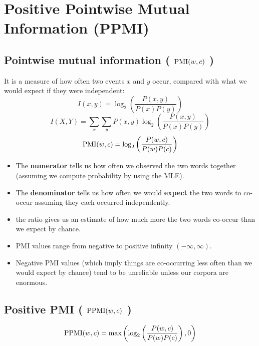 \chapter{Positive Pointwise Mutual Information (PPMI) \cite{nlp-1}}

\section{Pointwise mutual information ( $\operatorname{PMI}(w,c)$ ) \cite{nlp-1}}
It is a measure of how often two events $x$ and $y$ occur, compared with what we would expect if they were independent:
\[
    I(x,y) = \log_2\left(\displaystyle\frac{P(x,y)}{P(x)P(y)}\right)
\]
\[
    \displaystyle I(X,Y) = \sum_x \sum_y P(x,y) \log_2\left(\frac{P(x,y)}{P(x)P(y)}\right)
\]
\[
    \operatorname{PMI}(w,c) = \log_2\left(\displaystyle\frac{P(w,c)}{P(w)P(c)}\right)
\]

\begin{itemize}
    \item The \textbf{numerator} tells us how often we observed the two words together (assuming we compute probability by using the MLE).

    \item The \textbf{denominator} tells us how often we would \textbf{expect} the two words to co-occur assuming they each occurred independently.

    \item the ratio gives us an estimate of how much more the two words co-occur than we expect by chance.

    \item PMI values range from negative to positive infinity $(-\infty, \infty)$.

    \item Negative PMI values (which imply things are co-occurring less often than we would expect by chance) tend to be unreliable unless our corpora are enormous.

    
\end{itemize}


\section{Positive PMI ( $\operatorname{PPMI}(w,c)$ ) \cite{nlp-1}}\label{Positive Pointwise Mutual Information (PPMI)}

\[
    \operatorname{PPMI}(w,c) = \max\left(\log_2\left(\displaystyle\frac{P(w,c)}{P(w)P(c)}\right), 0\right)
\]


